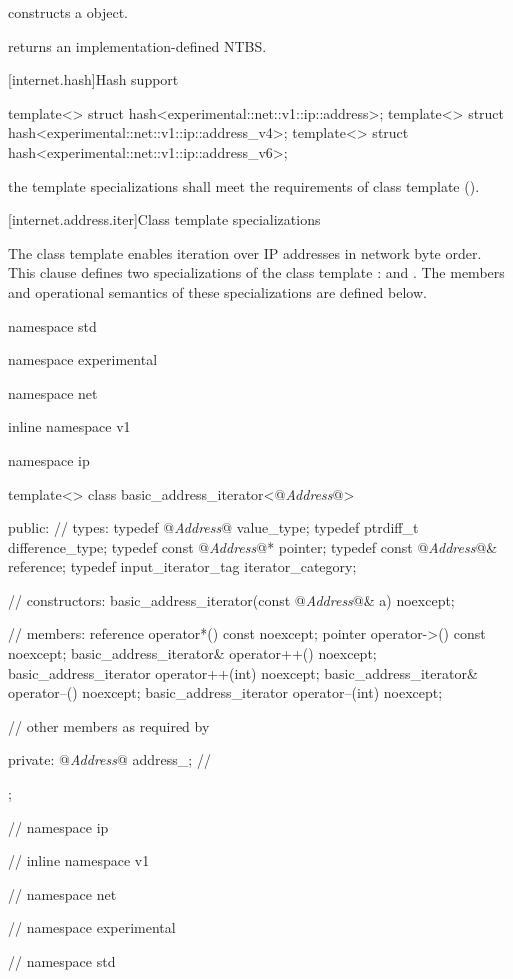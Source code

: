 \begin{itemdescr}
\pnum
\effects constructs a  object.

\pnum
\postconditions {} returns an implementation-defined NTBS.
\end{itemdescr}



[internet.hash]{Hash support}

\begin{itemdecl}
template<> struct hash<experimental::net::v1::ip::address>;
template<> struct hash<experimental::net::v1::ip::address_v4>;
template<> struct hash<experimental::net::v1::ip::address_v6>;
\end{itemdecl}

\begin{itemdescr}
\pnum
\requires the template specializations shall meet the requirements of class template  ().
\end{itemdescr}



[internet.address.iter]{Class template  specializations}

\pnum
The class template  enables iteration over IP addresses in network byte order. This clause defines two specializations of the class template :  and . The members and operational semantics of these specializations are defined below.

\begin{codeblock}
namespace std {
namespace experimental {
namespace net {
inline namespace v1 {
namespace ip {

  template<> class basic_address_iterator<@\textit{Address}@>
  {
  public:
    // types:
    typedef @\textit{Address}@ value_type;
    typedef ptrdiff_t difference_type;
    typedef const @\textit{Address}@* pointer;
    typedef const @\textit{Address}@& reference;
    typedef input_iterator_tag iterator_category;

    // constructors:
    basic_address_iterator(const @\textit{Address}@& a) noexcept;

    // members:
    reference operator*() const noexcept;
    pointer operator->() const noexcept;
    basic_address_iterator& operator++() noexcept;
    basic_address_iterator operator++(int) noexcept;
    basic_address_iterator& operator--() noexcept;
    basic_address_iterator operator--(int) noexcept;

    // other members as required by 

  private:
    @\textit{Address}@ address_; // \expos
  };

} // namespace ip
} // inline namespace v1
} // namespace net
} // namespace experimental
} // namespace std
\end{codeblock}

